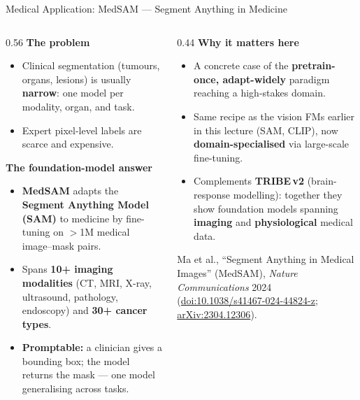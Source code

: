 \begin{frame}{Medical Application: MedSAM --- Segment Anything in Medicine}
  \begin{columns}[T,onlytextwidth]
    \begin{column}{0.56\textwidth}
      \textbf{The problem}
      \begin{itemize}\itemsep0.22em
        \item Clinical segmentation (tumours, organs, lesions) is usually \textbf{narrow}:
              one model per modality, organ, and task.
        \item Expert pixel-level labels are scarce and expensive.
      \end{itemize}
      \vspace{0.4em}
      \textbf{The foundation-model answer}
      \begin{itemize}\itemsep0.22em
        \item \textbf{MedSAM} adapts the \textbf{Segment Anything Model (SAM)} to medicine by
              fine-tuning on $>$1M medical image--mask pairs.
        \item Spans \textbf{10+ imaging modalities} (CT, MRI, X-ray, ultrasound, pathology,
              endoscopy) and \textbf{30+ cancer types}.
        \item \textbf{Promptable:} a clinician gives a bounding box; the model returns the mask
              --- one model generalising across tasks.
      \end{itemize}
    \end{column}
    \begin{column}{0.44\textwidth}
      \textbf{Why it matters here}
      \begin{itemize}\itemsep0.22em
        \item A concrete case of the \textbf{pretrain-once, adapt-widely} paradigm reaching a
              high-stakes domain.
        \item Same recipe as the vision FMs earlier in this lecture (SAM, CLIP), now
              \textbf{domain-specialised} via large-scale fine-tuning.
        \item Complements \textbf{TRIBE\,v2} (brain-response modelling): together they show
              foundation models spanning \textbf{imaging} and \textbf{physiological} medical data.
      \end{itemize}
      \vspace{0.5em}
      {\footnotesize Ma et al., ``Segment Anything in Medical Images'' (MedSAM),
      \emph{Nature Communications} 2024
      (\href{https://www.nature.com/articles/s41467-024-44824-z}{doi:10.1038/s41467-024-44824-z};
      \href{https://arxiv.org/abs/2304.12306}{arXiv:2304.12306}).}
    \end{column}
  \end{columns}
\end{frame}

